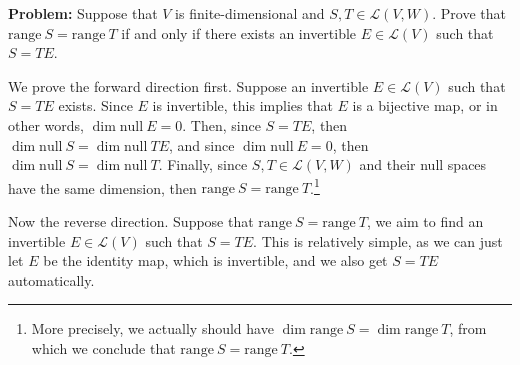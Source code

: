 \documentclass[10pt]{article}
\newcommand{\range}{\mathrm{range \ }}
\renewcommand{\null}{\mathrm{null \ }}
\newenvironment{problem}{\textbf{Problem:}}{}
\begin{document}
	\begin{problem}
		Suppose that \( V \) is finite-dimensional and \( S, T\in \mathcal L(V, W) \). Prove that 
		\( \range S = \range T \) if and only if there exists an invertible \( E \in \mathcal L(V) \) such that 
		 \( S = TE \). 
	\end{problem}

	\begin{solution}
		We prove the forward direction first. Suppose an invertible \( E \in \mathcal L(V) \) 
		such that \( S = TE \) exists. Since \( E \) is invertible, this implies that \( E \) is 
		a bijective map, or in other words, \( \dim \null E = 0 \). Then, since \( S = TE \), then 
		\( \dim \null S = \dim \null TE \), and since \( \dim \null E = 0 \), then \( \dim \null S = 
		\dim \null T\). Finally, since \( S, T \in \mathcal L(V, W) \) and their null spaces have the same dimension, 
		then \( \range S = \range T \).\footnote{More precisely, we actually should have \( \dim \range S 
		= \dim \range T\), from which we conclude that \( \range S = \range T \).}

		Now the reverse direction. Suppose that \( \range S = \range T \), we aim to find an 
		invertible \( E \in \mathcal L(V) \) such that \( S = TE \). This is relatively simple, as we can just 
		let \( E \) be the identity map, which is invertible, and we also get \( S = TE \) automatically.
	\end{solution}
\end{document}
